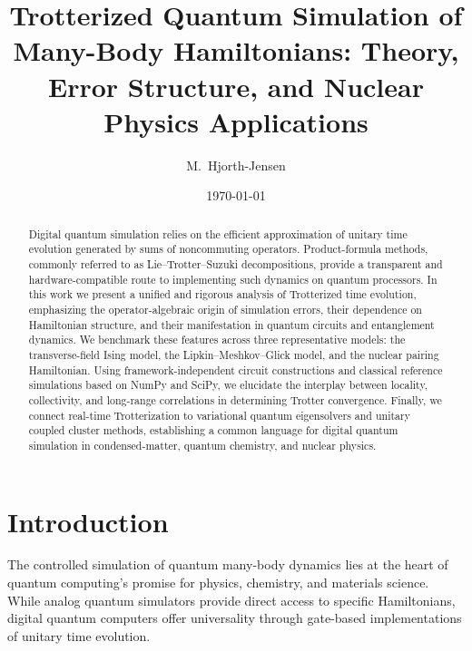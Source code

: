 \documentclass[
  aps,
  prxquantum,
  reprint,
  superscriptaddress,
  nofootinbib
]{revtex4-2}
\begin{document}
\title{Trotterized Quantum Simulation of Many-Body Hamiltonians:
Theory, Error Structure, and Nuclear Physics Applications}

\author{M.~Hjorth-Jensen}

\author{ }
\affiliation{ }

\date{\today}

\begin{abstract}
Digital quantum simulation relies on the efficient approximation of unitary
time evolution generated by sums of noncommuting operators. Product-formula
methods, commonly referred to as Lie--Trotter--Suzuki decompositions, provide a
transparent and hardware-compatible route to implementing such dynamics on
quantum processors. In this work we present a unified and rigorous analysis of
Trotterized time evolution, emphasizing the operator-algebraic origin of
simulation errors, their dependence on Hamiltonian structure, and their
manifestation in quantum circuits and entanglement dynamics. We benchmark these
features across three representative models: the transverse-field Ising model,
the Lipkin--Meshkov--Glick model, and the nuclear pairing Hamiltonian. Using
framework-independent circuit constructions and classical reference simulations
based on NumPy and SciPy, we elucidate the interplay between locality,
collectivity, and long-range correlations in determining Trotter convergence.
Finally, we connect real-time Trotterization to variational quantum eigensolvers
and unitary coupled cluster methods, establishing a common language for digital
quantum simulation in condensed-matter, quantum chemistry, and nuclear physics.
\end{abstract}

\maketitle

\section{Introduction}

The controlled simulation of quantum many-body dynamics lies at the heart of
quantum computing's promise for physics, chemistry, and materials science.
While analog quantum simulators provide direct access to specific Hamiltonians,
digital quantum computers offer universality through gate-based implementations
of unitary time evolution.
\end{document}
